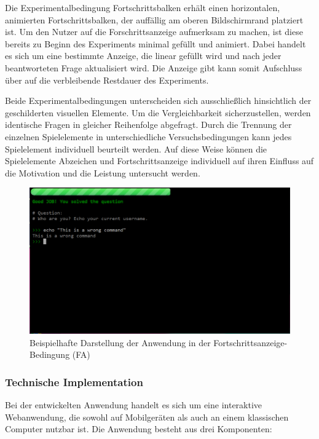 Die Experimentalbedingung Fortschrittsbalken erhält einen horizontalen, animierten Fortschrittsbalken, der auffällig am oberen Bildschirmrand platziert ist. Um den Nutzer auf die Forschrittsanzeige aufmerksam zu machen, ist diese bereits zu Beginn des Experiments minimal gefüllt und animiert. Dabei handelt es sich um eine bestimmte Anzeige, die linear gefüllt wird und  nach  jeder  beantworteten  Frage  aktualisiert wird. Die Anzeige gibt kann somit Aufschluss über auf die verbleibende Restdauer des Experiments.

Beide Experimentalbedingungen unterscheiden sich ausschließlich hinsichtlich der geschilderten visuellen Elemente. Um die Vergleichbarkeit sicherzustellen, werden identische Fragen in gleicher Reihenfolge abgefragt. Durch die Trennung der einzelnen Spielelemente in unterschiedliche Versuchsbedingungen kann jedes Spielelement individuell beurteilt werden. Auf diese Weise können die Spielelemente Abzeichen und Fortschrittsanzeige individuell auf ihren Einfluss auf die Motivation und die Leistung untersucht werden.

\begin{figure}[htbp]
    \centering
    \includegraphics[width=\textwidth]{img/full_web.png}
    \caption{Beispielhafte Darstellung der Anwendung in der Fortschrittsanzeige-Bedingung (FA)}
\end{figure}

\subsubsection{Technische Implementation}
Bei der entwickelten Anwendung handelt es sich um eine interaktive Webanwendung, die sowohl auf Mobilgeräten als auch an einem klassischen Computer nutzbar ist. Die Anwendung besteht aus drei Komponenten:

